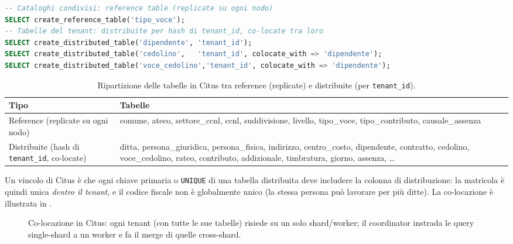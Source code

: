 \begin{lstlisting}[style=sobrio, language=SQL, caption={Dichiarazione della distribuzione in Citus.}, label={lst:ddl-citus}]
-- Cataloghi condivisi: reference table (replicate su ogni nodo)
SELECT create_reference_table('tipo_voce');
-- Tabelle del tenant: distribuite per hash di tenant_id, co-locate tra loro
SELECT create_distributed_table('dipendente', 'tenant_id');
SELECT create_distributed_table('cedolino',   'tenant_id', colocate_with => 'dipendente');
SELECT create_distributed_table('voce_cedolino','tenant_id', colocate_with => 'dipendente');
\end{lstlisting}

\begin{table}[htbp]
  \centering
  \caption{Ripartizione delle tabelle in Citus tra reference (replicate) e distribuite (per \texttt{tenant\_id}).}
  \label{tab:citus-tabelle}
  \begin{tabularx}{\textwidth}{@{}lX@{}}
    \toprule
    \textbf{Tipo} & \textbf{Tabelle} \\
    \midrule
    Reference (replicate su ogni nodo) & comune, ateco, settore\_ccnl, ccnl, suddivisione, livello,
      tipo\_voce, tipo\_contributo, causale\_assenza \\
    Distribuite (hash di \texttt{tenant\_id}, co-locate) & ditta, persona\_giuridica, persona\_fisica,
      indirizzo, centro\_costo, dipendente, contratto, cedolino, voce\_cedolino, rateo, contributo,
      addizionale, timbratura, giorno, assenza, \dots \\
    \bottomrule
  \end{tabularx}
\end{table}

Un vincolo di Citus è che ogni chiave primaria o \texttt{UNIQUE} di una tabella distribuita deve includere la
colonna di distribuzione: la matricola è quindi unica \emph{dentro il tenant}, e il codice fiscale non è
globalmente unico (la stessa persona può lavorare per più ditte). La co-locazione è illustrata in
.

\begin{figure}[htbp]
  \centering
  \caption{Co-locazione in Citus: ogni tenant (con tutte le sue tabelle) risiede su un solo shard/worker; il
    coordinator instrada le query single-shard a un worker e fa il merge di quelle cross-shard.}
  \label{fig:colocazione}
\end{figure}

